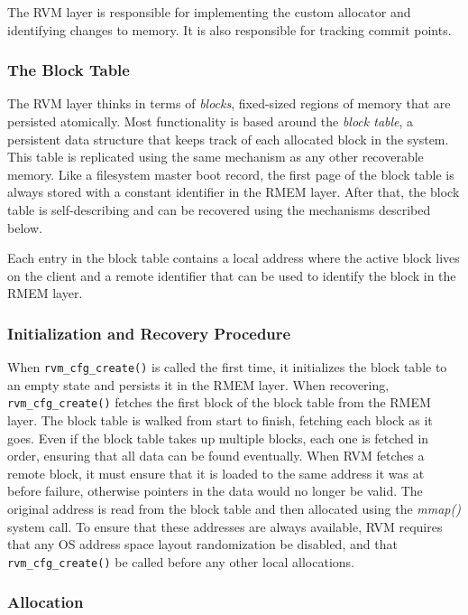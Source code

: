 The RVM layer is responsible for implementing the custom allocator and
identifying changes to memory. It is also responsible for tracking commit
points.

\subsubsection{The Block Table}
The RVM layer thinks in terms of \emph{blocks}, fixed-sized regions of
memory that are persisted atomically. Most functionality is based around the
\emph{block table}, a persistent data structure that keeps track of each
allocated block in the system. This table is replicated using the same
mechanism as any other recoverable memory. Like a filesystem master boot record,
the first page of the block table is always stored with a constant identifier
in the RMEM layer. After that, the block table is self-describing and can be
recovered using the mechanisms described below.

Each entry in the block table contains a local address where the active block
lives on the client and a remote identifier that can be used to identify the
block in the RMEM layer. 

\subsubsection{Initialization and Recovery Procedure}

When \verb|rvm_cfg_create()| is called the first time, it initializes the block
table to an empty state and persists it in the RMEM layer. When recovering,
\verb|rvm_cfg_create()| fetches the first block of the block table from the
RMEM layer. The block table is walked from start to finish, fetching each block
as it goes. Even if the block table takes up multiple blocks, each one is
fetched in order, ensuring that all data can be found eventually. When RVM
fetches a remote block, it must ensure that it is loaded to the same address it
was at before failure, otherwise pointers in the data would no longer be valid.
The original address is read from the block table and then allocated using the
\emph{mmap()} system call. To ensure that these addresses are always available,
RVM requires that any OS address space layout randomization be disabled, and
that \verb|rvm_cfg_create()| be called before any other local allocations.

\subsubsection{Allocation}

